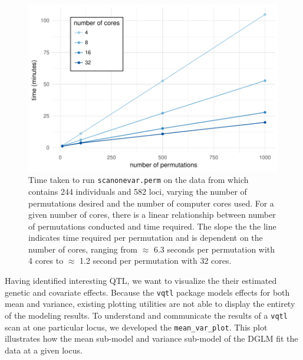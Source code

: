 \documentclass[9pt,twocolumn,twoside]{gsag3jnl}
\begin{document}
\begin{figure}[t]
    \includegraphics[width = \linewidth]{images/benchmark_kumar.pdf}
    \caption{
        Time taken to run \texttt{scanonevar.perm} on the data from \citet{Kumar2013} which contains 244 individuals and 582 loci, varying the number of permutations desired and the number of computer cores used.
        For a given number of cores, there is a linear relationship between number of permutations conducted and time required.
        The slope the the line indicates time required per permutation and is dependent on the number of cores, ranging from $\approx$ 6.3 seconds per permutation with 4 cores to $\approx$ 1.2 second per permutation with 32 cores.
    }
    \label{fig:benchmark_kumar}
\end{figure}


Having identified interesting QTL, we want to visualize the their estimated genetic and covariate effects.
Because the \texttt{vqtl} package models effects for both mean and variance, existing plotting utilities are not able to display the entirety of the modeling results.
To understand and communicate the results of a \texttt{vqtl} scan at one particular locus, we developed the \texttt{mean\_var\_plot}.
This plot illustrates how the mean sub-model and variance sub-model of the DGLM fit the data at a given locus.
\end{document}
